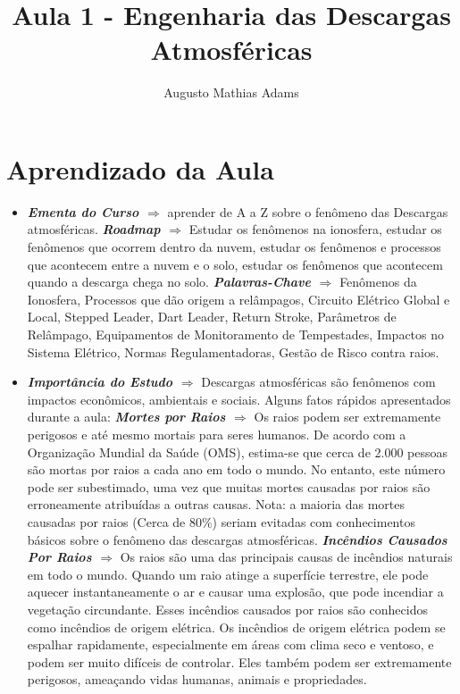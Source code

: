 \documentclass[a4paper, 12pt, onecolumn,singlespacing]{article}
\title{Aula 1 - Engenharia das Descargas Atmosféricas}
\author[1]{Augusto Mathias Adams}
\affil[1]{augusto.adams@ufpr.br}
\begin{document}
	
	\maketitle
	
	\section{Aprendizado da Aula}
	
	\begin{itemize}
		\item \textbf{\textit{Ementa do Curso $\Rightarrow$ }} aprender de A a Z sobre o fenômeno das Descargas atmosféricas.
		\subitem \textbf{\textit{Roadmap $\Rightarrow$}} Estudar os fenômenos na ionosfera,  estudar os fenômenos que ocorrem dentro da nuvem, estudar os fenômenos e processos que acontecem entre a nuvem e o solo, estudar os fenômenos que acontecem quando a descarga chega no solo.
		\subitem \textbf{\textit{Palavras-Chave $\Rightarrow$ }} Fenômenos da Ionosfera, Processos que dão origem a relâmpagos, Circuito Elétrico Global e Local, Stepped Leader, Dart Leader, Return Stroke, Parâmetros de Relâmpago, Equipamentos de Monitoramento de Tempestades, Impactos no Sistema Elétrico, Normas Regulamentadoras, Gestão de Risco contra raios.
		\item \textbf{\textit{Importância do Estudo $\Rightarrow$ }} Descargas atmosféricas são fenômenos com impactos econômicos, ambientais e sociais. Alguns fatos rápidos apresentados durante a aula:
		\subitem \textbf{\textit{Mortes por Raios $\Rightarrow$}}  Os raios podem ser extremamente perigosos e até mesmo mortais para seres humanos. De acordo com a Organização Mundial da Saúde (OMS), estima-se que cerca de 2.000 pessoas são mortas por raios a cada ano em todo o mundo. No entanto, este número pode ser subestimado, uma vez que muitas mortes causadas por raios são erroneamente atribuídas a outras causas. Nota: a maioria das mortes causadas por raios (Cerca de 80\%) seriam evitadas com conhecimentos básicos sobre o fenômeno das descargas atmosféricas.
		\subitem \textbf{\textit{Incêndios Causados Por Raios $\Rightarrow$}} Os raios são uma das principais causas de incêndios naturais em todo o mundo. Quando um raio atinge a superfície terrestre, ele pode aquecer instantaneamente o ar e causar uma explosão, que pode incendiar a vegetação circundante. Esses incêndios causados por raios são conhecidos como incêndios de origem elétrica. Os incêndios de origem elétrica podem se espalhar rapidamente, especialmente em áreas com clima seco e ventoso, e podem ser muito difíceis de controlar. Eles também podem ser extremamente perigosos, ameaçando vidas humanas, animais e propriedades.

\end{itemize}
\end{document}
